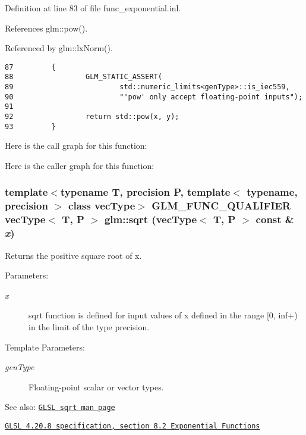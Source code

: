 Definition at line 83 of file func\_\-exponential.inl.

References glm::pow().

Referenced by glm::lxNorm().

\begin{Code}\begin{verbatim}87         {
88                 GLM_STATIC_ASSERT(
89                         std::numeric_limits<genType>::is_iec559,
90                         "'pow' only accept floating-point inputs");
91 
92                 return std::pow(x, y);
93         }
\end{verbatim}
\end{Code}




Here is the call graph for this function:

Here is the caller graph for this function:\hypertarget{group__core__func__exponential_gfe49b7b63045b6ab94bffbcd7e7a7bc8}{
\subsubsection[sqrt]{\setlength{\rightskip}{0pt plus 5cm}template$<$typename T, precision P, template$<$ typename, precision $>$ class vecType$>$ GLM\_\-FUNC\_\-QUALIFIER vecType$<$ T, P $>$ glm::sqrt (vecType$<$ T, P $>$ const \& {\em x})}}
\label{group__core__func__exponential_gfe49b7b63045b6ab94bffbcd7e7a7bc8}


Returns the positive square root of x.

\begin{Desc}
\item[Parameters:]
\begin{description}
\item[{\em x}]sqrt function is defined for input values of x defined in the range \mbox{[}0, inf+) in the limit of the type precision. \end{description}
\end{Desc}
\begin{Desc}
\item[Template Parameters:]
\begin{description}
\item[{\em genType}]Floating-point scalar or vector types.\end{description}
\end{Desc}
\begin{Desc}
\item[See also:]\href{http://www.opengl.org/sdk/docs/manglsl/xhtml/sqrt.xml}{\tt GLSL sqrt man page} 

\href{http://www.opengl.org/registry/doc/GLSLangSpec.4.20.8.pdf}{\tt GLSL 4.20.8 specification, section 8.2 Exponential Functions} \end{Desc}


